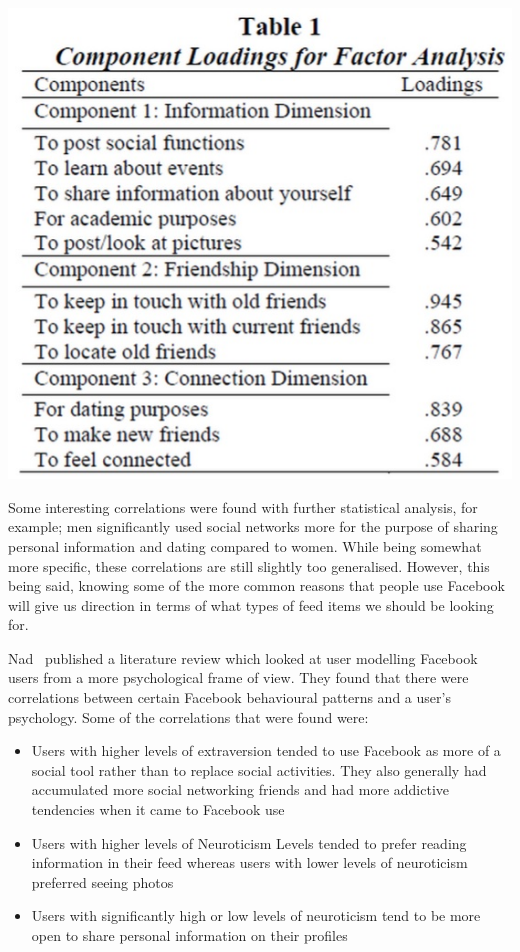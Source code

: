 \begin{center}
\includegraphics[scale=0.6]{images/factoranalysis.jpg}
\end{center}

Some interesting correlations were found with further statistical analysis, for example; men significantly used social networks more for the purpose of sharing personal information and dating compared to women. While being somewhat more specific, these correlations are still slightly too generalised. However, this being said, knowing some of the more common reasons that people use Facebook will give us direction in terms of what types of feed items we should be looking for.

Nad~\cite{nadkarni2012people} published a literature review which looked at user modelling Facebook users from a more psychological frame of view. They found that there were correlations between certain Facebook behavioural patterns and a user's psychology. Some of the correlations that were found were:

\begin{itemize}
\item Users with higher levels of extraversion tended to use Facebook as more of a social tool rather than to replace social activities. They also generally had accumulated more social networking friends and had more addictive tendencies when it came to Facebook use
\item Users with higher levels of Neuroticism Levels tended to prefer reading information in their feed whereas users with lower levels of neuroticism preferred seeing photos
\item Users with significantly high or low levels of neuroticism tend to be more open to share personal information on their profiles
\end{itemize}

